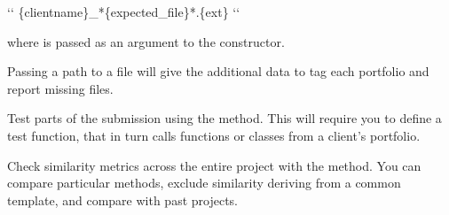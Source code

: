 \documentclass[letterpaper,10pt,english]{sphinxmanual}
\begin{document}
{}`{}` \{clientname\}\_*\{expected\_file\}*.\{ext\} {}`{}`

where  is passed as an argument to the  constructor.

Passing a path to a  file will give the  additional data to tag each portfolio and report missing files.

Test parts of the submission using the  method. This will require you to define a test function, that in turn calls functions or classes from a client’s portfolio.

Check similarity metrics across the entire project with the  method. You can compare particular methods, exclude similarity deriving from a common template, and compare with past projects.
\end{document}
